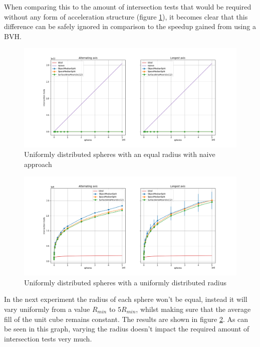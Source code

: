 \documentclass{article}
\begin{document}
When comparing this to the amount of intersection tests that would be required without any form of acceleration structure (figure \ref{fig:splitting_heuristisc_equal_spheres_uniform_position_with_naive}), it becomes clear that this difference can be safely ignored in comparison to the speedup gained from using a BVH.

\begin{figure}[!htb]
    \centering
    \includegraphics[width=12cm]{plots/splitting_heuristisc_equal_spheres_uniform_position_with_naive.png}
    \caption{Uniformly distributed spheres with an equal radius with naive approach}
    \label{fig:splitting_heuristisc_equal_spheres_uniform_position_with_naive}
\end{figure}

\begin{figure}[!htb]
    \centering
    \includegraphics[width=12cm]{plots/splitting_heuristisc_uniform_spheres_uniform_position.png}
    \caption{Uniformly distributed spheres with a uniformly distributed radius}
    \label{fig:splitting_heuristisc_uniform_spheres_uniform_position}
\end{figure}

In the next experiment the radius of each sphere won't be equal, instead it will vary uniformly from a value $R_{min}$ to $5R_{min}$, whilst making sure that the average fill of the unit cube remains constant. The results are shown in figure \ref{fig:splitting_heuristisc_uniform_spheres_uniform_position}. As can be seen in this graph, varying the radius doesn't impact the required amount of intersection tests very much.
\end{document}
